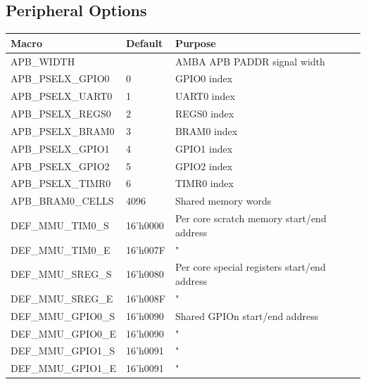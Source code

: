 \documentclass[11pt,a4paper]{report}
\begin{document}
{\begin{appendices}
\section{Peripheral Options}
\begin{table}[H]
\centering
\begin{tabular}{l|l|l}
Macro              & Default  & Purpose                                              \\ 
\hline
APB\_WIDTH         &          & AMBA APB PADDR signal width                          \\
APB\_PSELX\_GPIO0  & 0        & GPIO0 index                                          \\
APB\_PSELX\_UART0  & 1        & UART0 index                                          \\
APB\_PSELX\_REGS0  & 2        & REGS0 index                                          \\
APB\_PSELX\_BRAM0  & 3        & BRAM0 index                                          \\
APB\_PSELX\_GPIO1  & 4        & GPIO1 index                                          \\
APB\_PSELX\_GPIO2  & 5        & GPIO2 index                                          \\
APB\_PSELX\_TIMR0  & 6        & TIMR0 index                                          \\
APB\_BRAM0\_CELLS  & 4096     & Shared memory words                                  \\
DEF\_MMU\_TIM0\_S  & 16'h0000 & Per core scratch memory start/end address            \\
DEF\_MMU\_TIM0\_E  & 16'h007F & "                                                    \\
DEF\_MMU\_SREG\_S  & 16'h0080 & Per core special registers start/end address         \\
DEF\_MMU\_SREG\_E  & 16'h008F & "                                                    \\
DEF\_MMU\_GPIO0\_S & 16'h0090 & Shared GPIOn start/end address                       \\
DEF\_MMU\_GPIO0\_E & 16'h0090 & "                                                    \\
DEF\_MMU\_GPIO1\_S & 16'h0091 & "                                                    \\
DEF\_MMU\_GPIO1\_E & 16'h0091 & "                                                    \\

\end{tabular}
\end{table}
\end{appendices}}
\end{document}
